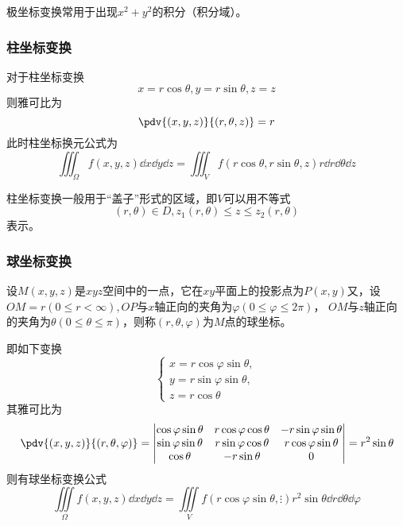 \begin{situation}
    极坐标变换常用于出现$x^2+y^2$的积分（积分域）。
\end{situation}

\subsubsection{柱坐标变换}
对于柱坐标变换
\[ x=r\cos\theta, y=r\sin\theta, z=z \]
则雅可比为
\[ \pdv{(x,y,z)}{(r,\theta,z)} = r \]
此时柱坐标换元公式为
\begin{equation}
    \iiint_{\Omega} f(x,y,z)\dd{x}\dd{y}\dd{z} = \iiint_{V}f(r\cos\theta,r\sin\theta,z)r\dd{r}\dd{\theta}\dd{z}
\end{equation}

\begin{situation}
    柱坐标变换一般用于“盖子”形式的区域，即$V$可以用不等式
    \[ (r,\theta)\in D, z_1(r,\theta) \leq z \leq z_2(r,\theta) \]
    表示。
\end{situation}

\subsubsection{球坐标变换}
设$M(x,y,z)$是$xyz$空间中的一点，它在$xy$平面上的投影点为$P(x,y)$又，设$OM=r(0\leq r < \infty),OP$与$x$轴正向的夹角为$\varphi(0\leq \varphi\leq 2\pi)$，
$OM$与$z$轴正向的夹角为$\theta(0\leq\theta\leq\pi)$，则称$(r,\theta,\varphi)$为$M$点的球坐标。

即如下变换
\[
    \begin{cases}
        x = r\cos\varphi\sin\theta, \\
        y = r\sin\varphi\sin\theta, \\
        z = r\cos\theta
    \end{cases}
\]
其雅可比为
\[
    \pdv{(x,y,z)}{(r,\theta,\varphi)} =
    \begin{vmatrix}
        \cos\varphi\sin\theta & r\cos\varphi\cos\theta & -r\sin\varphi\sin\theta \\
        \sin\varphi\sin\theta & r\sin\varphi\cos\theta & r\cos\varphi\sin\theta  \\
        \cos\theta            & -r\sin\theta           & 0
    \end{vmatrix}
    = r^2\sin\theta
\]
则有球坐标变换公式
\begin{equation}
    \iiint\limits_{\Omega} f(x,y,z)\dd{x}\dd{y}\dd{z} = \iiint\limits_{V}f(r\cos\varphi\sin\theta,\vdots)r^2\sin\theta\dd{r}\dd{\theta}\dd{\varphi}
\end{equation}

